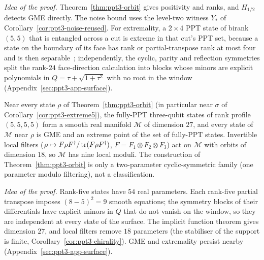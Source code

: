 \emph{Idea of the proof.} Theorem~\ref{thm:ppt3-orbit} gives positivity and ranks, and $H_{1/2}$ detects GME directly.
The noise bound uses the level-two witness $Y_*$ of Corollary~\ref{cor:ppt3-noise-reused}. For extremality, a $2\times4$ PPT state of birank $(5,5)$ that is entangled across a cut is extreme in that cut's PPT set, because a state on the boundary of its face has rank or partial-transpose rank at most four
and is then separable~\cite{KCKL,HLVC}; independently, the cyclic, parity and
reflection symmetries split the rank-$24$ face-direction calculation into blocks whose minors are explicit polynomials in
$Q=\tau+\sqrt{1+\tau^2}$ with no root in the window (Appendix~\ref{sec:ppt3-app-surface}).

\begin{proposition}\label{prop:ppt3-moduli}
Near every state $\rho$ of Theorem~\ref{thm:ppt3-orbit} (in particular near $\sigma$ of Corollary~\ref{cor:ppt3-extreme5}), the fully-PPT three-qubit states of rank profile $(5,5,5,5)$ form
a smooth real manifold $\mathcal M$ of dimension $27$, and every state of $\mathcal M$ near $\rho$ is GME and an extreme
point of the set of fully-PPT states. Invertible local filters ($\rho\mapsto F\rho F^{\dagger}/\operatorname{tr}(F\rho F^{\dagger})$,
$F=F_1\otimes F_2\otimes F_3$) act on $\mathcal M$ with orbits of dimension $18$, so $\mathcal M$ has nine local
moduli. The construction of Theorem~\ref{thm:ppt3-orbit} is only a two-parameter
cyclic-symmetric family (one parameter modulo filtering), not a classification.
\end{proposition}

\emph{Idea of the proof.} Rank-five states have $54$ real parameters. Each rank-five partial transpose imposes
$(8-5)^2=9$ smooth equations; the symmetry blocks of their differentials have explicit minors in $Q$ that do not vanish on the window, so they are
independent at every state of the surface. The implicit function theorem gives dimension $27$, and local filters remove
$18$ parameters (the stabiliser of the support is finite, Corollary~\ref{cor:ppt3-chirality}). GME and extremality persist nearby
(Appendix~\ref{sec:ppt3-app-surface}).

